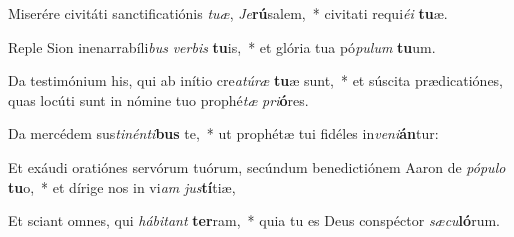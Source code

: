 \item Miserére civitáti sanctificatiónis \textit{tu}\textit{æ}, \textit{Je}\textbf{rú}salem,~* civitati requi\textit{é}\textit{i} \textbf{tu}æ.
\item Reple Sion inenarrabíli\textit{bus} \textit{ver}\textit{bis} \textbf{tu}is,~* et glória tua pó\textit{pu}\textit{lum} \textbf{tu}um.
\item Da testimónium his, qui ab inítio cre\textit{a}\textit{tú}\textit{ræ} \textbf{tu}æ sunt,~* et súscita prædicatiónes, quas locúti sunt in nómine tuo prophé\textit{tæ} \textit{pri}\textbf{ó}res.
\item Da mercédem sus\textit{ti}\textit{nén}\textit{ti}\textbf{bus} te,~* ut prophétæ tui fidéles in\textit{ve}\textit{ni}\textbf{án}tur:
\item Et exáudi oratiónes servórum tuórum, secúndum benedictiónem Aaron de \textit{pó}\textit{pu}\textit{lo} \textbf{tu}o,~* et dírige nos in vi\textit{am} \textit{jus}\textbf{tí}tiæ,
\item Et sciant omnes, qui \textit{há}\textit{bi}\textit{tant} \textbf{ter}ram,~* quia tu es Deus conspéctor \textit{sæ}\textit{cu}\textbf{ló}rum.
